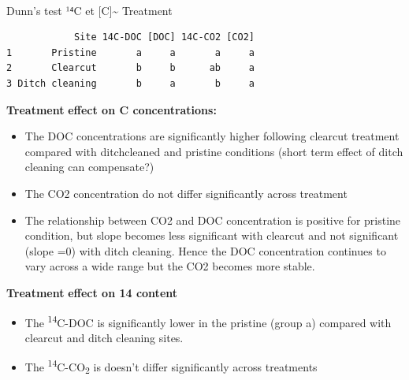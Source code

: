 \documentclass[
]{article}
\makeatletter
\let\oldparagraph\paragraph
\renewcommand{\paragraph}{
    \@ifstar
      \xxxParagraphStar
      \xxxParagraphNoStar
  }
\newcommand{\xxxParagraphStar}[1]{\oldparagraph*{#1}\mbox{}}
\newcommand{\xxxParagraphNoStar}[1]{\oldparagraph{#1}\mbox{}}
\makeatother
\begin{document}
\paragraph{Dunn's test \textbar{} ¹⁴C et {[}C{]}\textasciitilde{}
Treatment}\label{dunns-test-uxb9ux2074c-et-c-treatment}

\begin{verbatim}
            Site 14C-DOC [DOC] 14C-CO2 [CO2]
1       Pristine       a     a       a     a
2       Clearcut       b     b      ab     a
3 Ditch cleaning       b     a       b     a
\end{verbatim}

\begin{tcolorbox}[enhanced jigsaw, coltitle=black, opacitybacktitle=0.6, left=2mm, bottomtitle=1mm, colback=white, toprule=.15mm, arc=.35mm, toptitle=1mm, leftrule=.75mm, rightrule=.15mm, colbacktitle=quarto-callout-note-color!10!white, breakable, titlerule=0mm, bottomrule=.15mm, colframe=quarto-callout-note-color-frame, title=\textcolor{quarto-callout-note-color}{\faInfo}\hspace{0.5em}{Interpretation}, opacityback=0]

\textbf{Treatment} \textbf{effect on C concentrations:}

\begin{itemize}
\item
  The DOC concentrations are significantly higher following clearcut
  treatment compared with ditchcleaned and pristine conditions (short
  term effect of ditch cleaning can compensate?)
\item
  The CO2 concentration do not differ significantly across treatment
\item
  The relationship between CO2 and DOC concentration is positive for
  pristine condition, but slope becomes less significant with clearcut
  and not significant (slope =0) with ditch cleaning. Hence the DOC
  concentration continues to vary across a wide range but the CO2
  becomes more stable.
\end{itemize}

\textbf{Treatment} \textbf{effect on 14 content}

\begin{itemize}
\item
  The \textsuperscript{14}C-DOC is significantly lower in the pristine
  (group a) compared with clearcut and ditch cleaning sites.
\item
  The \textsuperscript{14}C-CO\textsubscript{2} is doesn't differ
  significantly across treatments
\end{itemize}

\end{tcolorbox}
\end{document}
